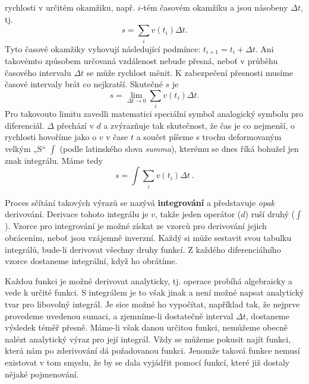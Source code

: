     rychlosti v určitém okamžiku, např. \(i\)-tém časovém okamžiku a jsou násobeny \(\Delta t\), tj.
    \begin{equation}\label{FYZ:eq123}
      s = \sum_{i}v(t_i)\Delta t.
    \end{equation}
    Tyto časové okamžiky vyhovují následující podmínce: \(t_{i+1} = t_i + \Delta t\). Ani takovémto 
    způsobem určovaná vzdálenost nebude přesná, neboť v průběhu časového intervalu \(\Delta t\) se 
    může rychlost měnit. K zabezpečení přesnosti musíme časové intervaly brát co nejkratší. 
    Skutečné \(s\) je
    \begin{equation}\label{FYZ:eq124}
      s = \lim_{\Delta t\to0}\sum_{i}v(t_i)\Delta t.
    \end{equation}
    Pro takovouto limitu zavedli matematici speciální symbol analogický symbolu pro diferenciál.    
    \(\Delta\) přechází v \(d\) a zvýrazňuje tak skutečnost, že čas je co nejmenší, o rychlosti 
    hovoříme jako o \(v\) v čase \(t\) a součet píšeme s trochu deformovaným velkým „S“ \(\int\) 
    (podle latinského slova \emph{summa}), kterému se dnes říká bohužel jen znak integrálu. Máme 
    tedy
    \begin{equation}\label{FYZ:eq125}
      \boxed{s = \int\sum_{i}v(t_i)\Delta t}\,.
    \end{equation}
    
    Proces sčítání takových výrazů se nazývá \textbf{integrování} a představuje \emph{opak} 
    derivování. Derivace tohoto integrálu je \(v\), takže jeden operátor (\(d\)) ruší druhý 
    (\(\int\)). Vzorce pro integrování je možné získat ze vzorců pro derivování jejich obrácením, 
    neboť jsou vzájemně inverzní. Každý si může sestavit svou tabulku integrálů, bude-li derivovat 
    všechny druhy funkcí. Z každého diferenciálního vzorce dostaneme integrální, když ho obrátíme.
    
    Každou funkci je možné derivovat analyticky, tj. operace probíhá algebraicky a vede k určité 
    funkci. S integrálem je to však jinak a není možné napsat analytický tvar pro libovolný 
    integrál. Je sice možné ho vypočítat, například tak, že nejprve provedeme uvedenou sumaci, a 
    zjemníme-li dostatečně interval \(\Delta t\), dostaneme výsledek téměř přesně. Máme-li však 
    danou určitou funkci, nemůžeme obecně nalézt analytický výraz pro její integrál. Vždy se můžeme 
    pokusit najít funkci, která nám po zderivování dá požadovanou funkci. Jenomže taková funkce 
    nemusí existovat v tom smyslu, že by se dala vyjádřit pomocí funkcí, které již dostaly nějaké 
    pojmenování.
    
